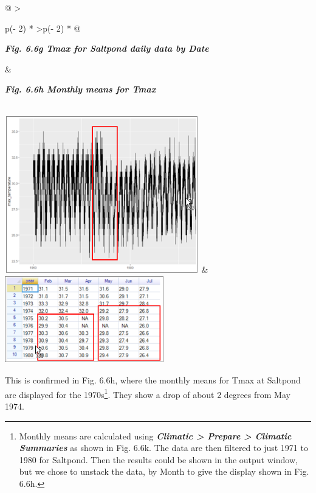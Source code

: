 \documentclass[
  letterpaper,
  DIV=11,
  numbers=noendperiod]{scrreprt}
\begin{document}
\begin{longtable}[]{@{}
  >{\raggedright\arraybackslash}p{(\columnwidth - 2\tabcolsep) * }
  >{\raggedleft\arraybackslash}p{(\columnwidth - 2\tabcolsep) * }@{}}
\toprule\noalign{}
\begin{minipage}[b]{\linewidth}\raggedright
\textbf{\emph{Fig. 6.6g Tmax for Saltpond daily data by Date}}
\end{minipage} & \begin{minipage}[b]{\linewidth}\raggedleft
\textbf{\emph{Fig. 6.6h Monthly means for Tmax}}
\end{minipage} \\
\midrule\noalign{}
\endhead
\bottomrule\noalign{}
\endlastfoot
\includegraphics[width=3.32047in,height=2.68146in]{figures/Fig6.6g.png}
& \includegraphics[width=2.72012in,height=1.5in]{figures/Fig6.6h.png} \\
\end{longtable}

This is confirmed in Fig. 6.6h, where the monthly means for Tmax at
Saltpond are displayed for the 1970s\footnote{Monthly means are
  calculated using \textbf{\emph{Climatic \textgreater{} Prepare
  \textgreater{} Climatic Summaries}} as shown in Fig. 6.6k. The data
  are then filtered to just 1971 to 1980 for Saltpond. Then the results
  could be shown in the output window, but we chose to unstack the data,
  by Month to give the display shown in Fig. 6.6h.}. They show a drop of
about 2 degrees from May 1974.
\end{document}
